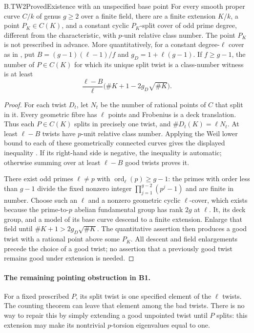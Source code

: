 \begin{claim}{B.TW2}{Proved}{Existence with an unspecified base point}
For every smooth proper curve $C/k$ of genus $g\ge2$ over a
finite field, there are a finite extension $K/k$, a point
$P_K\in C(K)$, and a constant cyclic $P_K$-split cover of odd
prime degree, different from the characteristic, with $p$-unit
relative class number. The point $P_K$ is not prescribed in
advance. More quantitatively, for a constant degree-$\ell$ cover
as in , put
$B=(g-1)(\ell-1)/f$ and $g_D=1+\ell(g-1)$. If $f\ge g-1$, the
number of $P\in C(K)$ for which its unique split twist is a
class-number witness is at least
\[
       \frac{\ell-B}{\ell}
             \bigl(\#K+1-2g_D\sqrt{\#K}\bigr).
\]
\end{claim}
\begin{proof}
For each twist $D_t$, let $N_t$ be the number of rational points
of $C$ that split in it. Every geometric fibre has $\ell$ points
and Frobenius is a deck translation. Thus each $P\in C(K)$
splits in precisely one twist, and
$\#D_t(K)=\ell N_t$. At least $\ell-B$ twists have $p$-unit
relative class number. Applying the Weil lower bound to each
of these geometrically connected curves gives the displayed
inequality \cite[Theorem 1.6 and formula 1.5.1]{WeilCurves}.
If its right-hand side is negative, the inequality is automatic;
otherwise summing over at least $\ell-B$ good twists proves it.

There exist odd primes $\ell\ne p$ with
$\operatorname{ord}_\ell(p)\ge g-1$: the primes with order less
than $g-1$ divide the fixed nonzero integer
$\prod_{j=1}^{g-2}(p^j-1)$ and are finite in number.
Choose such an $\ell$ and a nonzero geometric cyclic
$\ell$-cover, which exists because the prime-to-$p$ abelian
fundamental group has rank $2g$ at $\ell$.
It, its deck group, and a model of its base curve descend to a
finite extension. Enlarge that field until
$\#K+1>2g_D\sqrt{\#K}$. The quantitative assertion then produces
a good twist with a rational point above some $P_K$.
All descent and field enlargements precede the choice of a good
twist; no assertion that a previously good twist remains good
under extension is needed.
\end{proof}

\paragraph{The remaining pointing obstruction in B1.}
For a fixed prescribed $P$, its split twist is one specified
element of the $\ell$ twists. The counting theorem can leave
that element among the bad twists. There is no way to repair
this by simply extending a good unpointed twist until $P$
splits: this extension may make its nontrivial $p$-torsion
eigenvalues equal to one.

